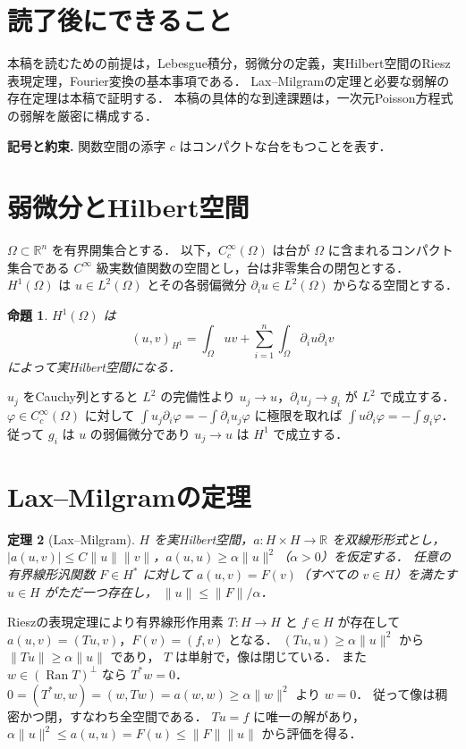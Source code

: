 \documentclass[a5paper,10pt,onecolumn]{jsarticle}
\makeatletter
\theoremstyle{mathnotetheorem}
\newtheorem{theorem}{定理}[section]
\newtheorem{proposition}[theorem]{命題}
\renewcommand{\proofname}{証明}
\renewenvironment{proof}[1][\proofname]{%
  \par\pushQED{\qed}\normalfont\topsep4\p@\@plus2\p@\relax
  \trivlist\item[\hskip\labelsep\bfseries #1]\ignorespaces
}{\popQED\endtrivlist\@endpefalse}
\newcommand{\norm}[1]{\lVert #1\rVert}
\makeatother
\begin{document}
\section*{読了後にできること}
本稿を読むための前提は，Lebesgue積分，弱微分の定義，実Hilbert空間のRiesz表現定理，Fourier変換の基本事項である．
Lax--Milgramの定理と必要な弱解の存在定理は本稿で証明する．
本稿の具体的な到達課題は，一次元Poisson方程式の弱解を厳密に構成する．


\par\noindent\textbf{記号と約束.}\quad
関数空間の添字 $c$ はコンパクトな台をもつことを表す．
\par

\section{弱微分とHilbert空間}
$\Omega\subset\mathbb R^n$ を有界開集合とする．
以下，$C_c^\infty(\Omega)$ は台が $\Omega$ に含まれるコンパクト集合である
$C^\infty$ 級実数値関数の空間とし，台は非零集合の閉包とする．
$H^1(\Omega)$ は $u\in L^2(\Omega)$ とその各弱偏微分
$\partial_i u\in L^2(\Omega)$ からなる空間とする．
\begin{proposition}
$H^1(\Omega)$ は
\[
 (u,v)_{H^1}=\int_\Omega uv+\sum_{i=1}^n\int_\Omega\partial_i u\partial_i v
\]
によって実Hilbert空間になる．
\end{proposition}
\begin{proof}
$u_j$ をCauchy列とすると $L^2$ の完備性より
$u_j\to u$，$\partial_i u_j\to g_i$ が $L^2$ で成立する．
$\varphi\in C_c^\infty(\Omega)$ に対して
$\int u_j\partial_i\varphi=-\int\partial_i u_j\varphi$ に極限を取れば
$\int u\partial_i\varphi=-\int g_i\varphi$．
従って $g_i$ は $u$ の弱偏微分であり $u_j\to u$ は $H^1$ で成立する．
\end{proof}
\section{Lax--Milgramの定理}
\begin{theorem}[Lax--Milgram]\label{thm:LM}
$H$ を実Hilbert空間，$a:H\times H\to\mathbb R$ を双線形形式とし，
$|a(u,v)|\le C\norm u\norm v$，$a(u,u)\ge\alpha\norm u^2$（$\alpha>0$）を仮定する．
任意の有界線形汎関数 $F\in H^*$ に対して
$ a(u,v)=F(v)$（すべての $v\in H$）を満たす $u\in H$ がただ一つ存在し，
$\norm u\le\norm F/\alpha$．
\end{theorem}
\begin{proof}
Rieszの表現定理により有界線形作用素 $T:H\to H$ と $f\in H$ が存在して
$a(u,v)=(Tu,v)$，$F(v)=(f,v)$ となる．
$(Tu,u)\ge\alpha\norm u^2$ から $\norm{Tu}\ge\alpha\norm u$ であり，
$T$ は単射で，像は閉じている．
また $w\in(\operatorname{Ran}T)^\perp$ なら $T^*w=0$．
$0=(T^*w,w)=(w,Tw)=a(w,w)\ge\alpha\norm w^2$ より $w=0$．
従って像は稠密かつ閉，すなわち全空間である．
$Tu=f$ に唯一の解があり，
$\alpha\norm u^2\le a(u,u)=F(u)\le\norm F\norm u$ から評価を得る．
\end{proof}
\end{document}
